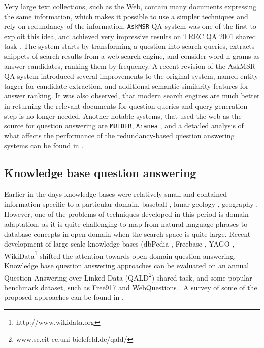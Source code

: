 Very large text collections, such as the Web, contain many documents expressing the same information, which makes it possible to use a simpler techniques and rely on redundancy of the information.
\texttt{AskMSR} QA system was one of the first to exploit this idea, and achieved very impressive results on TREC QA 2001 shared task \cite{brill2002analysis}.
The system starts by transforming a question into search queries, extracts snippets of search results from a web search engine, and consider word n-grams as answer candidates, ranking them by frequency.
A recent revision of the AskMSR QA system \cite{tsai2015web} introduced several improvements to the original system, \ie named entity tagger for candidate extraction, and additional semantic similarity features for answer ranking.
It was also observed, that modern search engines are much better in returning the relevant documents for question queries and query generation step is no longer needed.
Another notable systems, that used the web as the source for question answering are \texttt{MULDER}\cite{kwok2001scaling}, \texttt{Aranea} \cite{lin2003question}, and a detailed analysis of what affects the performance of the redundancy-based question answering systems can be found in \cite{lin2007exploration}.

\subsection{Knowledge base question answering}
\label{section:relatedwork:factoid:kbqa}

Earlier in the days knowledge bases were relatively small and contained information specific to a particular domain, \eg baseball \cite{green1961baseball}, lunar geology \cite{woods1977lunar}, geography \cite{zelle1996learning}.
However, one of the problems of techniques developed in this period is domain adaptation, as it is quite challenging to map from natural language phrases to database concepts in open domain when the search space is quite large.
Recent development of large scale knowledge bases (\eg dbPedia \cite{auer2007dbpedia}, Freebase \cite{Bollacker:2008:FCC:1376616.1376746}, YAGO \cite{suchanek2007yago}, WikiData\footnote{http://www.wikidata.org} shifted the attention towards open domain question answering.
Knowledge base question answering approaches can be evaluated on an annual Question Answering over Linked Data (QALD\footnote{www.sc.cit-ec.uni-bielefeld.de/qald/}) shared task, and some popular benchmark dataset, such as Free917 \cite{cai2013large} and WebQuestions \cite{BerantCFL13:sempre}.
A survey of some of the proposed approaches can be found in \cite{unger2014introduction}.

